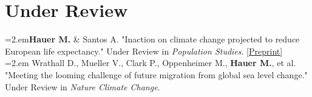 \section{Under Review}

  \hangindent=2.em\textbf{Hauer M.} \& Santos A. "Inaction on climate change projected to reduce European life expectancy." Under Review in \textit{Population Studies}.  \href{https://osf.io/preprints/socarxiv/ngtxr}{[Preprint]}\\  

    \hangindent=2.em Wrathall D., Mueller V., Clark P., Oppenheimer M., \textbf{Hauer M.}, et al. "Meeting the looming challenge of future migration from global sea level change." Under Review in \textit{Nature Climate Change}. \\
    

%     
% 
%   
%     
    
  
    




